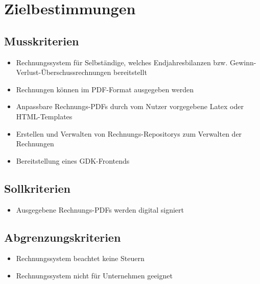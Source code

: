 
\section{Zielbestimmungen}



\subsection{Musskriterien}

\begin{itemize}
	\item Rechnungssystem für Selbständige, welches Endjahresbilanzen bzw. Gewinn-Verlust-Überschussrechnungen bereitstellt
	\item Rechnungen können im PDF-Format ausgegeben werden
	\item Anpassbare Rechnungs-PDFs durch vom Nutzer vorgegebene Latex oder HTML-Templates
	\item Erstellen und Verwalten von Rechnungs-Repositorys zum Verwalten der Rechnungen
	\item Bereitstellung eines GDK-Frontends
\end{itemize}

\subsection{Sollkriterien}

\begin{itemize}
	\item Ausgegebene Rechnungs-PDFs werden digital signiert
\end{itemize}

\subsection{Abgrenzungskriterien}

\begin{itemize}
	\item Rechnungssystem beachtet keine Steuern
	\item Rechnungssystem nicht für Unternehmen geeignet
\end{itemize}